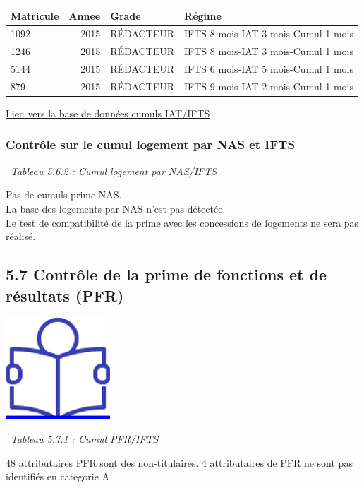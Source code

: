 \begin{longtable}[]{@{}lrll@{}}
\toprule
Matricule & Annee & Grade & Régime\tabularnewline
\midrule
\endhead
1092 & 2015 & RÉDACTEUR & IFTS 8 mois-IAT 3 mois-Cumul 1
mois\tabularnewline
1246 & 2015 & RÉDACTEUR & IFTS 8 mois-IAT 3 mois-Cumul 1
mois\tabularnewline
5144 & 2015 & RÉDACTEUR & IFTS 6 mois-IAT 5 mois-Cumul 1
mois\tabularnewline
879 & 2015 & RÉDACTEUR & IFTS 9 mois-IAT 2 mois-Cumul 1
mois\tabularnewline
\bottomrule
\end{longtable}

\href{../Bases/Reglementation/personnels.iat.ifts.csv}{Lien vers la base de
données cumuls IAT/IFTS}

\hypertarget{controle-sur-le-cumul-logement-par-nas-et-ifts}{%
\subsubsection{Contrôle sur le cumul logement par NAS et
IFTS}\label{controle-sur-le-cumul-logement-par-nas-et-ifts}}

~\emph{Tableau 5.6.2 : Cumul logement par NAS/IFTS}

Pas de cumuls prime-NAS.\\
La base des logements par NAS n'est pas détectée.\\
Le test de compatibilité de la prime avec les concessions de logements
ne sera pas réalisé.

\hypertarget{controle-de-la-prime-de-fonctions-et-de-resultats-pfr}{%
\subsection{5.7 Contrôle de la prime de fonctions et de résultats
(PFR)}\label{controle-de-la-prime-de-fonctions-et-de-resultats-pfr}}

\href{../Docs/Notices/fiche_PFR.odt}{\includegraphics{icones/Notice.png}}

~\emph{Tableau 5.7.1 : Cumul PFR/IFTS}

48 attributaires PFR sont des non-titulaires. 4 attributaires de PFR ne
sont pas identifiés en categorie A .

